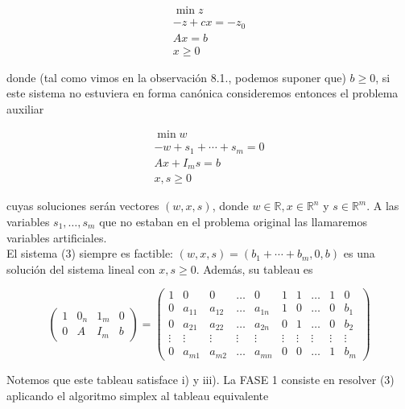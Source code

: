 \documentclass[10pt]{article}
\begin{document}
\begin{gather*}
\min z \\
-z+c x=-z_{0} \\
A x=b  \tag{2}\\
x \geq 0
\end{gather*}


donde (tal como vimos en la observación 8.1., podemos suponer que) $b \geq 0$, si este sistema no estuviera en forma canónica consideremos entonces el problema auxiliar


\begin{gather*}
\min w \\
-w+s_{1}+\cdots+s_{m}=0 \\
A x+I_{m} s=b  \tag{3}\\
x, s \geq 0
\end{gather*}


cuyas soluciones serán vectores $(w, x, s)$, donde $w \in \mathbb{R}, x \in \mathbb{R}^{n}$ y $s \in \mathbb{R}^{m}$. A las variables $s_{1}, \ldots, s_{m}$ que no estaban en el problema original las llamaremos variables artificiales.\\
El sistema (3) siempre es factible: $(w, x, s)=\left(b_{1}+\cdots+b_{m}, 0, b\right)$ es una solución del sistema lineal con $x, s \geq 0$. Además, su tableau es

$$
\left(\begin{array}{ccc|c}
1 & 0_{n} & 1_{m} & 0 \\
0 & A & I_{m} & b
\end{array}\right)=\left(\begin{array}{ccccccccc|c}
1 & 0 & 0 & \ldots & 0 & 1 & 1 & \ldots & 1 & 0 \\
0 & a_{11} & a_{12} & \ldots & a_{1 n} & 1 & 0 & \ldots & 0 & b_{1} \\
0 & a_{21} & a_{22} & \ldots & a_{2 n} & 0 & 1 & \ldots & 0 & b_{2} \\
\vdots & \vdots & \vdots & \vdots & \vdots & \vdots & \vdots & \vdots & \vdots & \vdots \\
0 & a_{m 1} & a_{m 2} & \ldots & a_{m n} & 0 & 0 & \ldots & 1 & b_{m}
\end{array}\right)
$$

Notemos que este tableau satisface i) y iii). La FASE 1 consiste en resolver (3) aplicando el algoritmo simplex al tableau equivalente
\end{document}
